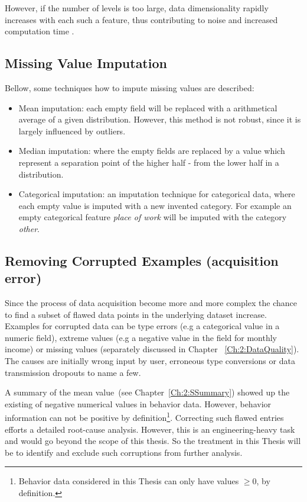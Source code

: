 However, if the number of levels is too large, data dimensionality rapidly increases with each such a feature, thus contributing to noise and increased computation time \cite{briscoef06}.



\subsection{Missing Value Imputation}\label{Ch:2:MVI} 
Bellow, some techniques how to impute missing values are described:
\begin{itemize}
    
        \item Mean imputation: each empty field will be replaced with a arithmetical average of a given distribution. However, this method is not robust, since it is largely influenced by outliers.
        
        \item Median imputation: where the empty fields are replaced by a value which represent a separation point of the higher half - from the lower half in a distribution. 
        
        \item Categorical imputation: an imputation technique for categorical data, where each empty value is imputed with a new invented category. For example an empty categorical feature \textit{place of work} will be imputed with the category \textit{other}.

\end{itemize}



\subsection{Removing Corrupted Examples (acquisition error)}\label{Ch:2:RCD}
Since the process of data acquisition become more and more complex the chance to find a subset of flawed data points in the underlying dataset increase. Examples for corrupted data can be type errors (e.g a categorical value in a numeric field), extreme values (e.g a negative value in the field for monthly income) or missing values (separately discussed in Chapter ~\ref{Ch:2:DataQuality}). The causes are initially wrong input by user, erroneous type conversions or data transmission dropouts to name a few. 

A summary of the mean value~(see Chapter~\ref{Ch:2:SSummary}) showed up the existing of negative numerical values in behavior data. However, behavior information can not be positive by definition\footnote{Behavior data considered in this Thesis can only have values  \(\geq 0\), by definition.}.
Correcting such flawed entries efforts a detailed root-cause analysis. However, this is an engineering-heavy task and would go beyond the scope of this thesis. So the treatment in this Thesis will be to identify and exclude such corruptions from further analysis. 


